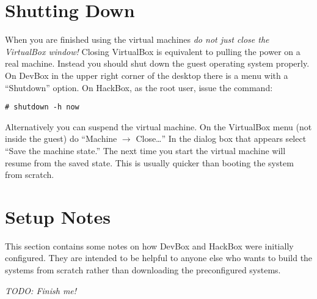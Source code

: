 \documentclass[twocolumn]{article}
\begin{document}
\section{Shutting Down}

When you are finished using the virtual machines \emph{do not just close the VirtualBox window!}
Closing VirtualBox is equivalent to pulling the power on a real machine. Instead you should shut
down the guest operating system properly. On DevBox in the upper right corner of the desktop
there is a menu with a ``Shutdown'' option. On HackBox, as the root user, issue the command:
\begin{Verbatim}
# shutdown -h now
\end{Verbatim}

Alternatively you can suspend the virtual machine. On the VirtualBox menu (not inside the guest)
do ``Machine $\rightarrow$ Close\ldots'' In the dialog box that appears select ``Save the
machine state.'' The next time you start the virtual machine will resume from the saved state.
This is usually quicker than booting the system from scratch.

\section{Setup Notes}

This section contains some notes on how DevBox and HackBox were initially configured. They are
intended to be helpful to anyone else who wants to build the systems from scratch rather than
downloading the preconfigured systems.

\textit{TODO: Finish me!}
\end{document}
